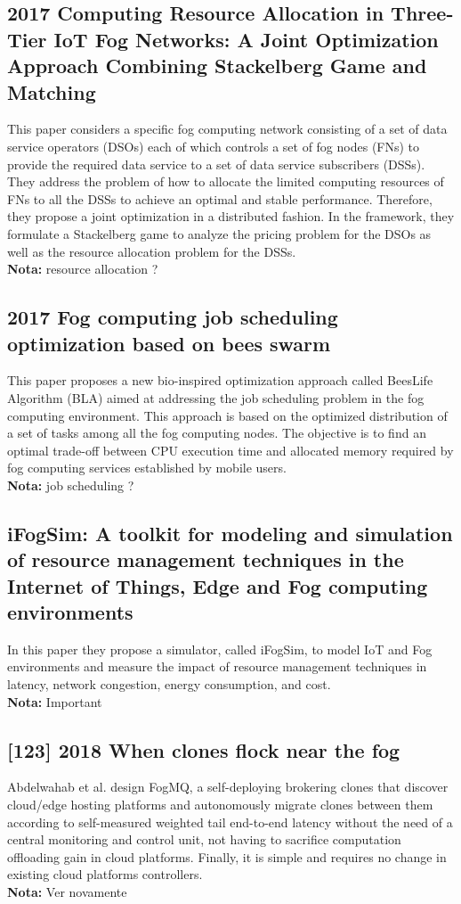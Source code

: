 \subsection{2017 Computing Resource Allocation in Three-Tier IoT Fog Networks: A Joint Optimization Approach Combining Stackelberg Game and Matching}
This paper considers a specific fog computing network consisting of a set of data service operators (DSOs) each of which controls a set of fog nodes (FNs) to provide the required data service to a set of data service subscribers (DSSs). They address the problem of how to allocate the limited computing resources of FNs to all the DSSs to achieve an optimal and stable performance. Therefore, they propose a joint optimization in a distributed fashion. In the framework, they formulate a Stackelberg game to analyze the pricing problem for the DSOs as well as the resource allocation problem for the DSSs.\\
\textbf{Nota:} resource allocation ?

\subsection{2017 Fog computing job scheduling optimization based on bees swarm}
This paper proposes a new bio-inspired optimization approach called BeesLife Algorithm (BLA) aimed at addressing the job scheduling problem in the fog computing environment. This approach is based on the optimized distribution of a set of tasks among all the fog computing nodes. The objective is to find an optimal trade-off between CPU execution time and allocated memory required by fog computing services established by mobile users.\\
\textbf{Nota:} job scheduling ?

\subsection{iFogSim: A toolkit for modeling and simulation of resource management techniques in the Internet of Things, Edge and Fog computing environments}
\label{subsec:paper01} \cite{gupta2017ifogsim}
In this paper they propose a simulator, called iFogSim, to model IoT and Fog environments and measure the impact of resource management techniques in latency, network congestion, energy consumption, and cost.\\
\textbf{Nota:} Important

\subsection{[123] 2018 When clones flock near the fog}
\label{subsec:paper02}
Abdelwahab et al. \cite{abdelwahab2018clones} design FogMQ, a self-deploying brokering clones that discover cloud/edge hosting platforms and autonomously migrate clones between them according to self-measured weighted tail end-to-end latency without the need of a central monitoring and control unit, not having to sacrifice computation offloading gain in cloud platforms. Finally, it is simple and requires no change in existing cloud platforms controllers.\\
\textbf{Nota:} Ver novamente

